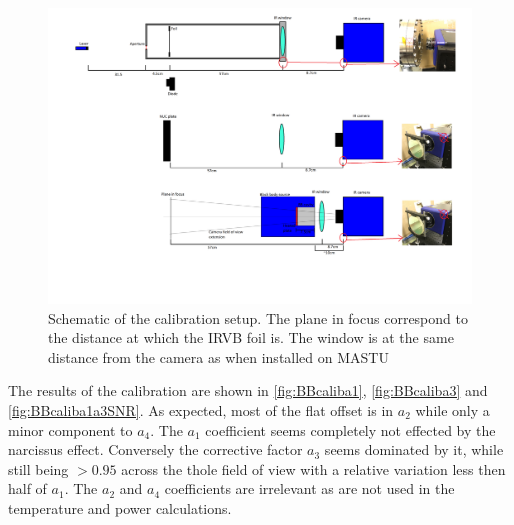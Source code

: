 \begin{figure}
	\centering
	\includegraphics[trim={800 300 0 1200},clip,width=\linewidth]{Chapters/appendix1/figs/calib_schematics.png}
	\caption{Schematic of the calibration setup. The plane in focus correspond to the distance at which the IRVB foil is. The window is at the same distance from the camera as when installed on MASTU}
	\label{fig:BBcalib}
\end{figure}

The results of the calibration are shown in \autoref{fig:BBcaliba1}, \ref{fig:BBcaliba3} and \ref{fig:BBcaliba1a3SNR}. As expected, most of the flat offset is in $a_2$ while only a minor component to $a_4$. The $a_1$ coefficient seems completely not effected by the narcissus effect. Conversely the corrective factor $a_3$ seems dominated by it, while still being $>0.95$ across the thole field of view with a relative variation less then half of $a_1$. The $a_2$ and $a_4$ coefficients are irrelevant as are not used in the temperature and power calculations.

